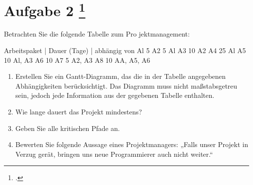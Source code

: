 \documentclass{lehramt-informatik-aufgabe}
\begin{document}
\section{Aufgabe 2
\footcite{66116:2020:09}}

Betrachten Sie die folgende Tabelle zum Pro jektmanagement:

Arbeitspaket | Dauer (Tage) | abhängig von
Al 5
A2 5 Al
A3 10 A2
A4 25 Al
A5 10 Al, A3
A6 10
A7 5 A2, A3
A8 10 AA, A5, A6

\begin{enumerate}

\item Erstellen Sie ein Gantt-Diagramm, das die in der Tabelle
angegebenen Abhängigkeiten berücksichtigt. Das Diagramm muss nicht
maßstabsgetreu sein, jedoch jede Information aus der gegebenen Tabelle
enthalten.


\item Wie lange dauert das Projekt mindestens?


\item Geben Sie alle kritischen Pfade an.


\item Bewerten Sie folgende Aussage eines Projektmanagers: „Falls unser
Projekt in Verzug gerät, bringen uns neue Programmierer auch nicht
weiter.“

\end{enumerate}
\end{document}

